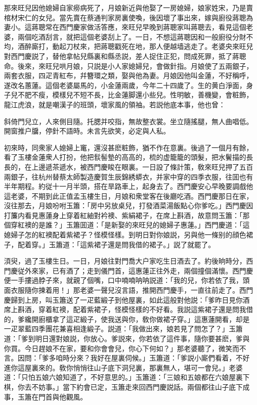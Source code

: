 那來旺兒因他媳婦自家癆病死了，月娘新近與他娶了一房媳婦，娘家姓宋，乃是賣棺材宋仁的女兒。當先賣在蔡通判家房裏使喚，後因壞了事出來，嫁與廚役蔣聰為妻小。這蔣聰常在西門慶家做活答應，來旺兒早晚到蔣聰家叫蔣聰去，看見這個老婆，兩個吃酒刮言，就把這個老婆刮上了。一日，不想這蔣聰因和一般廚役分財不均，酒醉廝打，動起刀杖來，把蔣聰戳死在地，那人便越墙逃走了。老婆央來旺兒對西門慶説了，替他拿帖兒縣裏和縣丞説，差人捉住正犯，問成死罪，抵了蔣聰命。後來，來旺兒哄月娘，只説是小人家媳婦兒，會做針指。月娘使了五兩銀子，兩套衣服，四疋青紅布，幷簪環之類，娶與他為妻。月娘因他叫金蓮，不好稱呼，遂改名蕙蓮。這個老婆屬馬的，小金蓮兩歲，今年二十四歲了。生的黄白淨面，身子兒不肥不瘦，模樣兒不短不長，比金蓮脚還小些兒。性明敏，善機變，會粧飾，龍江虎浪，就是嘲漢子的班頭，壞家風的領袖。若説他底本事，他也曾：

斜倚門兒立，人來側目隨。托腮并咬指，無故整衣裳。坐立隨搖腿，無人曲唱低。開窗推户牖，停針不語時。未言先欲笑，必定與人私。

初來時，同衆家人媳婦上竃，還沒甚麽粧飾，猶不作在意裏。後過了一個月有餘，看了玉樓金蓮衆人打扮，他把䯼髻墊的高高的，梳的虚籠籠的頭髮，把水鬢描的長長的，在上邊遞茶遞水，被西門慶睃在眼裏。一日設了條計策，敎來旺兒押了五百兩銀子，往杭州替蔡太師製造慶賀生辰錦綉蟒衣，并家中穿的四季衣服，往囬也有半年期程。約従十一月半頭，搭在旱路車上，起身去了。西門慶安心早晚要調戲他這老婆，不期到此正值孟玉樓生日，月娘和衆堂客在後廳吃酒。西門慶那日在家，沒往那去，月娘吩咐玉簫：「房中另放桌兒，打發酒菜湯飯點心你爹吃。」西門慶因打簾内看見惠蓮身上穿着紅紬對衿襖、紫絹裙子，在席上斟酒，故意問玉簫：「那個穿紅襖的是誰？」玉簫囬道：「是新娶的來旺兒的媳婦子惠蓮。」西門慶道：「這媳婦子怎的紅襖配着紫裙子？怪模怪樣。到明日對你娘説，另與他一條别的顔色裙子，配着穿。」玉簫道：「這紫裙子還是問我借的裙子。」説了就罷了。

湏臾，過了玉樓生日。一日，月娘往對門喬大户家吃生日酒去了。約後晌時分，西門慶従外來家，已有酒了；走到儀門首，這惠蓮正往外走，兩個撞個滿懷。西門慶便一手摟過脖子來，就親了個嘴，口中喃喃呐呐説道：「我的兒，你若依了我，頭面衣服隨你揀着用！」那老婆一聲兒沒言語，推開西門慶手，一直往前走了。西門慶歸到上房，叫玉簫送了一疋藍緞子到他屋裏，如此這般對他説：「爹昨日見你酒席上斟酒，穿着紅襖，配着紫裙子，怪模怪樣的不好看。我説這紫裙子還是問我借的，爹纔開廚櫃拿了這疋緞子，使我送與你，敎你做裙子穿。」這惠蓮開看，却是一疋翠藍四季團花兼喜相逢緞子。説道：「我做出來，娘若見了問怎了？」玉簫道：「爹到明日還對娘説，你放心。爹説來，你若依了這件事，隨你要甚麽，爹與你買。今日趕娘不在家，要和你會會兒，你心下何如？」那老婆聽了，微笑而不言。因問：「爹多咱時分來？我好在屋裏伺候。」玉簫道：「爹説小廝們看着，不好進你這屋裏來的。敎你悄悄往山子底下洞兒裏，那裏無人，堪可一會兒。」老婆道：「只怕五娘六娘知道了，不好意思的。」玉簫道：「三娘和五娘都在六娘屋裏下棋，你去不妨事。」當下約會已定，玉簫走來回西門慶説話。兩個都往山子底下成事，玉簫在門首與他觀風。

